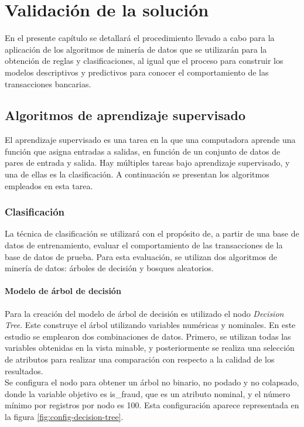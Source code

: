 \chapter{Validación de la solución}\label{chap:3}

En el presente capítulo se detallará el procedimiento llevado a cabo para la aplicación de los algoritmos de minería de datos que se utilizarán para la obtención de reglas y clasificaciones, al igual que el proceso para construir los modelos descriptivos y predictivos para conocer el comportamiento de las transacciones bancarias.

\section{Algoritmos de aprendizaje supervisado}

El aprendizaje supervisado es una tarea en la que una computadora aprende una función que asigna entradas a salidas, en función de un conjunto de datos de pares de entrada y salida. Hay múltiples tareas bajo aprendizaje supervisado, y una de ellas es la clasificación. A continuación se presentan los algoritmos empleados en esta tarea.

\subsection{Clasificación}

La técnica de clasificación se utilizará con el propósito de, a partir de una base de datos de entrenamiento, evaluar el comportamiento de las transacciones de la base de datos de prueba. Para esta evaluación, se utilizan dos algoritmos de minería de datos: árboles de decisión y bosques aleatorios.

\subsubsection{Modelo de árbol de decisión}
Para la creación del modelo de árbol de decisión es utilizado el nodo \textit{Decision Tree}. Este construye el árbol utilizando variables numéricas y nominales. En este estudio se emplearon dos combinaciones de datos. Primero, se utilizan todas las variables obtenidas en la vista minable, y posteriormente se realiza una selección de atributos para realizar una comparación con respecto a la calidad de los resultados. \\
Se configura el nodo para obtener un árbol no binario, no podado y no colapsado, donde la variable objetivo es \textsf{is\_fraud}, que es un atributo nominal, y el número mínimo por registros por nodo es 100. Esta configuración aparece representada en la figura \ref{fig:config-decision-tree}. 

